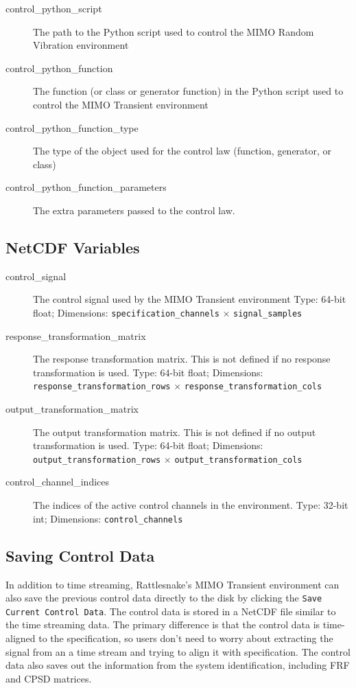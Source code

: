 \documentclass[pdf,12pt,report]{SANDreport}
\newcommand{\inlineCode}{\lstinline[basicstyle=\bfseries\ttfamily]}
\begin{document}
\begin{description}
        \item[control\_python\_script] The path to the Python script used to control the \Ac{MIMO} Random Vibration environment
        \item[control\_python\_function] The function (or class or generator function) in the Python script used to control the \Ac{MIMO} Transient environment
        \item[control\_python\_function\_type] The type of the object used for the control law (function, generator, or class)
        \item[control\_python\_function\_parameters] The extra parameters passed to the control law.
       \end{description}
    
    \subsection{NetCDF Variables}
    \begin{description}
        \item[control\_signal] The control signal used by the \Ac{MIMO} Transient environment  Type: 64-bit float; Dimensions: \inlineCode{specification_channels} $\times$ \inlineCode{signal_samples}
        \item[response\_transformation\_matrix] The response transformation matrix.  This is not defined if no response transformation is used.  Type: 64-bit float; Dimensions: \inlineCode{response_transformation_rows} $\times$ \inlineCode{response_transformation_cols}
        \item[output\_transformation\_matrix] The output transformation matrix.  This is not defined if no output transformation is used.  Type: 64-bit float; Dimensions: \inlineCode{output_transformation_rows} $\times$ \inlineCode{output_transformation_cols}
        \item[control\_channel\_indices] The indices of the active control channels in the environment.  Type: 32-bit int; Dimensions: \inlineCode{control_channels}
       \end{description}
    
    \subsection{Saving Control Data}
    
    In addition to time streaming, Rattlesnake's \Ac{MIMO} Transient environment can also save the previous control data directly to the disk by clicking the \inlineCode{Save Current Control Data}.  The control data is stored in a NetCDF file similar to the time streaming data.  The primary difference is that the control data is time-aligned to the specification, so users don't need to worry about extracting the signal from an a time stream and trying to align it with specification.  The control data also saves out the information from the system identification, including \Ac{FRF} and \Ac{CPSD} matrices.
    
\end{document}
